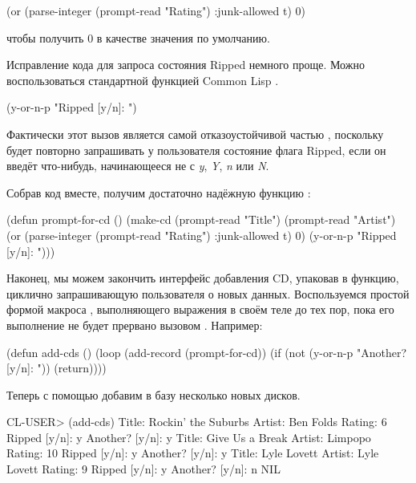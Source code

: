 \begin{myverb}
(or (parse-integer (prompt-read "Rating") :junk-allowed t) 0)
\end{myverb}

\noindent{}чтобы получить 0 в качестве значения по умолчанию.

Исправление кода для запроса состояния Ripped немного проще. Можно воспользоваться
стандартной функцией Common Lisp .

\begin{myverb}
(y-or-n-p "Ripped [y/n]: ")
\end{myverb}

Фактически этот вызов является самой отказоустойчивой частью ,
поскольку  будет повторно запрашивать у пользователя состояние флага
Ripped, если он введёт что-нибудь, начинающееся не с \textit{y}, \textit{Y}, \textit{n}
или \textit{N}.

Собрав код вместе, получим достаточно надёжную функцию :

\begin{myverb}
(defun prompt-for-cd ()
  (make-cd
   (prompt-read "Title")
   (prompt-read "Artist")
   (or (parse-integer (prompt-read "Rating") :junk-allowed t) 0)
   (y-or-n-p "Ripped [y/n]: ")))
\end{myverb}

Наконец, мы можем закончить интерфейс добавления CD, упаковав  в
функцию, циклично запрашивающую пользователя о новых данных. Воспользуемся простой формой
макроса , выполняющего выражения в своём теле до тех пор, пока его выполнение
не будет прервано вызовом . Например:

\begin{myverb}
(defun add-cds ()
  (loop (add-record (prompt-for-cd))
      (if (not (y-or-n-p "Another? [y/n]: ")) (return))))
\end{myverb}

Теперь с помощью  добавим в базу несколько новых дисков.

\begin{myverb}
  CL-USER> (add-cds)
  Title: Rockin' the Suburbs
  Artist: Ben Folds
  Rating: 6
  Ripped  [y/n]: y
  Another?  [y/n]: y
  Title: Give Us a Break
  Artist: Limpopo
  Rating: 10
  Ripped  [y/n]: y
  Another?  [y/n]: y
  Title: Lyle Lovett
  Artist: Lyle Lovett
  Rating: 9
  Ripped  [y/n]: y
  Another?  [y/n]: n
  NIL
\end{myverb}

